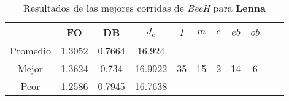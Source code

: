 \begin{table}[h!]
\footnotesize
\begin{center}
\begin{tabular}{|c|c|c|c|c|c|c|c|c|c|c|}
\hline
& {\bf FO} & {\bf DB}& $J_e$ & $I$ & $m$ & $e$ & $eb$ & $ob$ \\
\hline
\hline
Promedio   & 1.3052 & 0.7664  & 16.924 &  &  &  &  & \\
\cline{1-4}
Mejor & 1.3624 & 0.734  & 16.9922 & 35 & 15 & 2 & 14 & 6\\
\cline{1-4}
Peor & 1.2586 & 0.7945  & 16.7638 &    &  &  &  & \\\hline
\end{tabular}
\caption{Resultados de las mejores corridas de \emph{BeeH} para {\bf Lenna}}
\label{tb:pmpbeehibimg}
\end{center}
\end{table}

